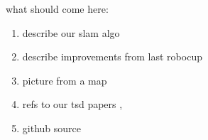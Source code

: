 
what should come here:
\begin{enumerate}
	\item describe our slam algo
	\item describe improvements from last robocup
	\item picture from a map
	\item refs to our tsd papers \cite{May2014}, \cite{Koch2015}
	\item github source
\end{enumerate}

